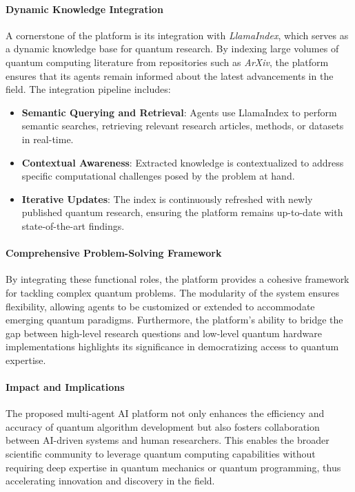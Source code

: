 \documentclass[12pt]{article}
\begin{document}
\paragraph{Dynamic Knowledge Integration}
A cornerstone of the platform is its integration with \textit{LlamaIndex}, which serves as a dynamic knowledge base for quantum research. By indexing large volumes of quantum computing literature from repositories such as \textit{ArXiv}, the platform ensures that its agents remain informed about the latest advancements in the field. The integration pipeline includes:
\begin{itemize}
    \item \textbf{Semantic Querying and Retrieval}: Agents use LlamaIndex to perform semantic searches, retrieving relevant research articles, methods, or datasets in real-time.
    \item \textbf{Contextual Awareness}: Extracted knowledge is contextualized to address specific computational challenges posed by the problem at hand.
    \item \textbf{Iterative Updates}: The index is continuously refreshed with newly published quantum research, ensuring the platform remains up-to-date with state-of-the-art findings.
\end{itemize}

\paragraph{Comprehensive Problem-Solving Framework}
By integrating these functional roles, the platform provides a cohesive framework for tackling complex quantum problems. The modularity of the system ensures flexibility, allowing agents to be customized or extended to accommodate emerging quantum paradigms. Furthermore, the platform’s ability to bridge the gap between high-level research questions and low-level quantum hardware implementations highlights its significance in democratizing access to quantum expertise.

\paragraph{Impact and Implications}
The proposed multi-agent AI platform not only enhances the efficiency and accuracy of quantum algorithm development but also fosters collaboration between AI-driven systems and human researchers. This enables the broader scientific community to leverage quantum computing capabilities without requiring deep expertise in quantum mechanics or quantum programming, thus accelerating innovation and discovery in the field.
\end{document}
